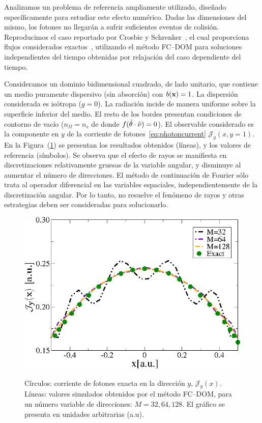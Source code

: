 Analizamos un problema  
de referencia ampliamente utilizado, 
diseñado específicamente para estudiar este efecto numérico.
Dadas las dimensiones del mismo, 
los fotones no llegarán a sufrir suficientes eventos de colisión.
Reproducimos 
el caso reportado por Crosbie y Schrenker~\cite{Crosbie1984}, 
el cual proporciona flujos considerados exactos~\cite{Ramankutty1997,tagnekamdem2015}, 
utilizando el método FC--DOM para soluciones independientes 
del tiempo obtenidas por relajación del caso dependiente del tiempo. 

Consideramos un dominio bidimensional cuadrado, de lado unitario, 
que contiene un medio puramente dispersivo (sin absorción) 
con $b(\mathbf{x})=1$. La dispersión considerada es isótropa ($g=0$). 
La radiación incide de manera uniforme sobre la superficie inferior del medio. 
El resto de los bordes presentan condiciones de contorno de vacío ($n_{\Omega}=n_{s}$ 
de donde $f(\hat{\theta} \cdot \hat{\nu})=0$). El observable considerado es la componente en
 $y$ de la corriente de fotones~\eqref{eq:photoncurrent} $\mathcal{J}_y(x,y=1)$. En la Figura~(\ref{fig:fluxph3}) 
se presentan los resultados obtenidos (líneas), y los valores de referencia (símbolos). 
Se observa que el efecto de rayos se manifiesta en discretizaciones 
relativamente gruesas de la variable angular, y disminuye al aumentar 
el número de direcciones. 
El método de continuación de Fourier sólo trata 
al operador diferencial en las variables espaciales, independientemente 
de la discretización angular. Por lo tanto, no 
resuelve el fenómeno de rayos y otras estrategias deben ser consideradas 
para solucionarlo.
\begin{figure}[h!]
\centering
  \includegraphics[width=0.48\linewidth]{figuras/raycurrent.eps}\\
  \caption{
Círculos: corriente de fotones exacta en la dirección $y$, $\mathcal{J}_y(x)$. 
Líneas: valores simulados obtenidos por el método FC--DOM, 
para un número variable de direcciones: $M=32,64,128$. El gráfico 
se presenta en unidades arbitrarias (a.u).}
 \label{fig:fluxph3}
\end{figure}

